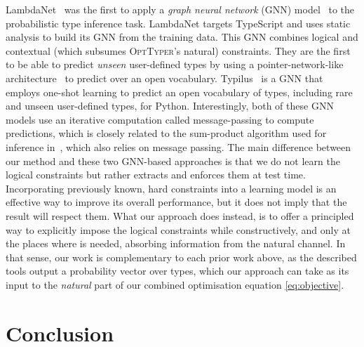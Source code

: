 \documentclass[acmsmall, review, anonymous]{acmart}\settopmatter{printfolios=true,printccs=false,printacmref=false}
\newcommand{\projectname}{\textsc{OptTyper}\xspace}
\begin{document}
LambdaNet~\citep{wei20} was the first to apply a \emph{graph neural network} (GNN) model~\citep{Gilmer2017-qd,allamanis17a} to the probabilistic type inference task.
LambdaNet targets TypeScript and uses static analysis to build its GNN from the training data. 
This GNN combines logical and contextual (which subsumes \projectname's natural) constraints.
They are the first to be able to predict \emph{unseen} user-defined types by using a pointer-network-like architecture~\citep{vinyals15,Allamanis2016-su} to predict over an open vocabulary.
Typilus~\citep{allamanis20} is a GNN that employs one-shot learning to predict an open vocabulary of types, including rare and unseen user-defined types, for Python. 
Interestingly, both of these GNN models use an iterative
computation called message-passing to compute predictions,
which is closely related to the sum-product algorithm
used for inference in~\cite{xu16}, which also relies on message passing.
The main difference between our method and these two GNN-based approaches is that we do not learn the logical constraints but rather extracts and enforces them at test time.
Incorporating previously known, hard constraints into a learning
model is an effective way to improve its overall performance, but it does not imply that the result will respect them. What our approach does instead, is to offer a principled way to explicitly impose the logical constraints while constructively, 
and only at the places where is needed, absorbing information from the natural channel. In that sense, our work is complementary to each prior work above, as the described tools output
a probability vector over types, which our approach can take as its input to the
\textit{natural} part of our combined optimisation equation \eqref{eq:objective}.

\section{Conclusion}\label{sec:conclusion}
\end{document}
